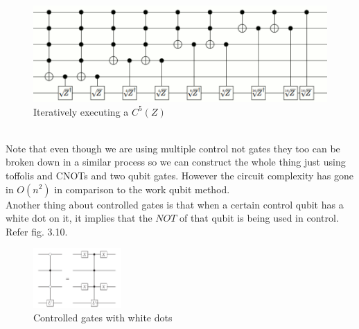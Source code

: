 \documentclass{report}
\begin{document}
\begin{figure}[ht]
\centering
\includegraphics[width = \textwidth]{images/iterative.png}
\caption{Iteratively executing a $C^5(Z)$}
\end{figure}\\
Note that even though we are using multiple control not gates they too can be broken down in a similar process so we can construct the whole thing just using toffolis and CNOTs and two qubit gates. However the circuit complexity has gone in $O(n^2)$ in comparison to the work qubit method.\\
Another thing about controlled gates is that when a certain control qubit has a white dot on it, it implies that the $NOT$ of that qubit is being used in control. Refer fig. 3.10.
\begin{figure}[ht]
\centering
\includegraphics[width = 0.3\textwidth]{images/white dots.png}
\caption{Controlled gates with white dots}
\end{figure}\\
\end{document}
